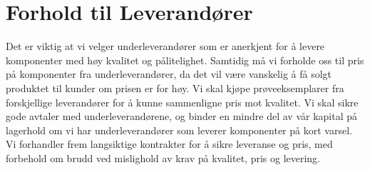 \section{Forhold til Leverandører}
Det er viktig at vi velger underleverandører som er anerkjent for å levere 
komponenter med høy kvalitet og pålitelighet. Samtidig må vi forholde oss til 
pris på komponenter fra underleverandører, da det vil være vanskelig å få 
solgt produktet til kunder om prisen er for høy. Vi skal kjøpe 
prøveeksemplarer fra forskjellige leverandører for å kunne sammenligne pris 
mot kvalitet. Vi skal sikre gode avtaler med underleverandørene, og binder en 
mindre del av vår kapital på lagerhold om vi har underleverandører som 
leverer komponenter på kort varsel. Vi forhandler frem langsiktige kontrakter 
for å sikre leveranse og pris, med forbehold om brudd ved mislighold av krav 
på kvalitet, pris og levering. 

